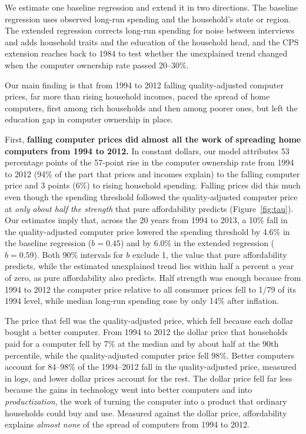 \documentclass[11pt]{article}
\begin{document}
We estimate one baseline regression and extend it in two directions. The baseline regression uses observed long-run spending and the household's state or region. The extended regression corrects long-run spending for noise between interviews and adds household traits and the education of the household head, and the CPS extension reaches back to 1984 to test whether the unexplained trend changed when the computer ownership rate passed 20--30\%.

Our main finding is that from 1994 to 2012 falling quality-adjusted computer prices, far more than rising household incomes, paced the spread of home computers, first among rich households and then among poorer ones, but left the education gap in computer ownership in place.

First, \textbf{falling computer prices did almost all the work of spreading home computers from 1994 to 2012.} In constant dollars, our model attributes 53 percentage points of the 57-point rise in the computer ownership rate from 1994 to 2012 (94\% of the part that prices and incomes explain) to the falling computer price and 3 points (6\%) to rising household spending. Falling prices did this much even though the spending threshold followed the quality-adjusted computer price at \emph{only about half the strength} that pure affordability predicts (Figure~\ref{fig:tau}). Our estimates imply that, across the 20 years from 1994 to 2013, a 10\% fall in the quality-adjusted computer price lowered the spending threshold by 4.6\% in the baseline regression ($b = 0.45$) and by 6.0\% in the extended regression ($b = 0.59$). Both 90\% intervals for $b$ exclude 1, the value that pure affordability predicts, while the estimated unexplained trend lies within half a percent a year of zero, as pure affordability also predicts. Half strength was enough because from 1994 to 2012 the computer price relative to all consumer prices fell to 1/79 of its 1994 level, while median long-run spending rose by only 14\% after inflation.

The price that fell was the quality-adjusted price, which fell because each dollar bought a better computer. From 1994 to 2012 the dollar price that households paid for a computer fell by 7\% at the median and by about half at the 90th percentile, while the quality-adjusted computer price fell 98\%. Better computers account for 84--98\% of the 1994--2012 fall in the quality-adjusted price, measured in logs, and lower dollar prices account for the rest. The dollar price fell far less because the gains in technology went into better computers and into \emph{productization}, the work of turning the computer into a product that ordinary households could buy and use. Measured against the dollar price, affordability explains \emph{almost none} of the spread of computers from 1994 to 2012.
\end{document}
